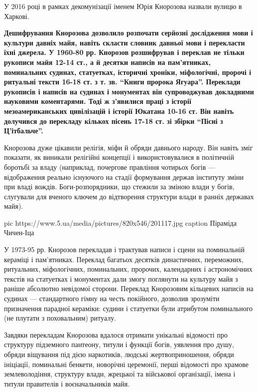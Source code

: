 У 2016 році в рамках декомунізації іменем Юрія Кнорозова назвали вулицю в
Харкові.

\begin{leftbar}
\bfseries
Дешифрування Кнорозова дозволило розпочати серйозні дослідження мови і
культури давніх майя, навіть скласти словник давньої мови і перекласти
їхні джерела. У 1960-80 рр. Кнорозов розшифрував і переклав не тільки
рукописи майя 12-14 ст., а й десятки написів на пам'ятниках, поминальних
судинах, статуетках, історичні хроніки, міфологічні, пророчі і ритуальні
тексти 16-18 ст. з т. зв. \enquote{Книги пророка Ягуара}. Переклади рукописів і
написів на судинах і монументах він супроводжував докладними науковими
коментарями. Тоді ж з'явилися праці з історії мезоамериканських
цивілізацій і історії Юкатана 10-16 ст. Він навіть долучився до
перекладу кількох пісень 17-18 ст. зі збірки \enquote{Пісні з Ц'ітбальче}.
\end{leftbar}

Кнорозова дуже цікавили релігія, міфи й обряди давнього народу. Він навіть
зміг показати, як виникали релігійні концепції і використовувалися в
політичній боротьбі за владу (наприклад, почергове правління чотирьох
богів --- відображення реально існуючого на стадії формування держав
інституту зміни при владі вождів. Боги-розпорядники, що стежили за зміною
влади у богів, слугували для вченого ключем до відтворення структури влади
в ранніх державах майя).

\ifcmt
pic https://www.5.ua/media/pictures/820x546/201117.jpg
caption Піраміда Чичен-Іца
\fi

У 1973-95 рр. Кнорозов перекладав і трактував написи і сцени на
поминальній кераміці і пам'ятниках. Переклад багатьох десятків
династичних, переможних, ритуальних, міфологічних, поминальних, пророчих,
календарних і астрономічних текстів на статуетках і монументах дали змогу
поглянути на культуру майя з раніше абсолютно невідомої сторони. Переклад
Кнорозовим кільцевих написів на судинах --- стандартного гімну на честь
покійного, дозволив зрозуміти призначення парадної кераміки: судини і
статуетки були атрибутом поминального (не плутати з поховальним) ритуалу.

Завдяки перекладам Кнорозова вдалося отримати унікальні відомості про
структуру підземного пантеону, титули і функції богів, уявлення про душу,
обряди віщування під дією наркотиків, людські жертвоприношення, обряди
ініціації, поминальні бенкети, новорічні церемонії, перші відомості про
храмове землеволодіння, структуру влади, жрецької та військової
організації, імена і титули правителів і воєначальників майя.

